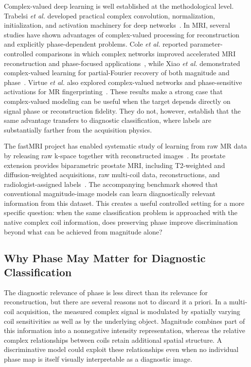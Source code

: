 \documentclass[journal]{IEEEtran}
\begin{document}
Complex-valued deep learning is well established at the methodological level. Trabelsi \emph{et al.} developed practical complex convolution, normalization, initialization, and activation machinery for deep networks~\cite{Trabelsi2018DeepComplex}. In MRI, several studies have shown advantages of complex-valued processing for reconstruction and explicitly phase-dependent problems. Cole \emph{et al.} reported parameter-controlled comparisons in which complex networks improved accelerated MRI reconstruction and phase-focused applications~\cite{Cole2021ComplexMRI}, while Xiao \emph{et al.} demonstrated complex-valued learning for partial-Fourier recovery of both magnitude and phase~\cite{Xiao2022ComplexPartialFourier}. Virtue \emph{et al.} also explored complex-valued networks and phase-sensitive activations for MR fingerprinting~\cite{Virtue2017ComplexActivation}. These results make a strong case that complex-valued modeling can be useful when the target depends directly on signal phase or reconstruction fidelity. They do not, however, establish that the same advantage transfers to diagnostic classification, where labels are substantially farther from the acquisition physics.

The fastMRI project has enabled systematic study of learning from raw MR data by releasing raw k-space together with reconstructed images~\cite{Knoll2020fastMRI}. Its prostate extension provides biparametric prostate MRI, including T2-weighted and diffusion-weighted acquisitions, raw multi-coil data, reconstructions, and radiologist-assigned labels~\cite{Tibrewala2024FastMRIProstate}. The accompanying benchmark showed that conventional magnitude-image models can learn diagnostically relevant information from this dataset. This creates a useful controlled setting for a more specific question: when the same classification problem is approached with the native complex coil information, does preserving phase improve discrimination beyond what can be achieved from magnitude alone?

\subsection{Why Phase May Matter for Diagnostic Classification}
The diagnostic relevance of phase is less direct than its relevance for reconstruction, but there are several reasons not to discard it a priori. In a multi-coil acquisition, the measured complex signal is modulated by spatially varying coil sensitivities as well as by the underlying object. Magnitude combines part of this information into a nonnegative intensity representation, whereas the relative complex relationships between coils retain additional spatial structure. A discriminative model could exploit these relationships even when no individual phase map is itself visually interpretable as a diagnostic image.
\end{document}
